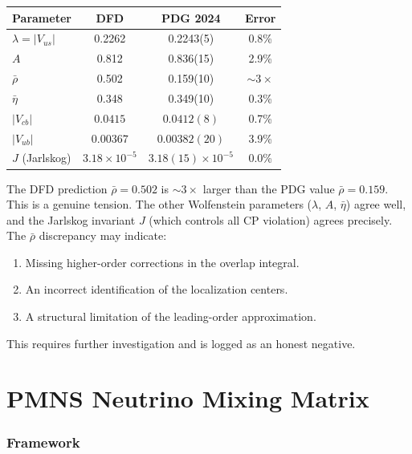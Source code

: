 \documentclass[11pt,a4paper]{article}
\theoremstyle{remark}
\begin{document}
\begin{center}
\begin{tabular}{lccc}
\toprule
\textbf{Parameter} & \textbf{DFD} & \textbf{PDG 2024} & \textbf{Error} \\
\midrule
$\lambda = |V_{us}|$ & 0.2262 & 0.2243(5) & 0.8\% \\
$A$ & 0.812 & 0.836(15) & 2.9\% \\
$\bar\rho$ & 0.502 & 0.159(10) & $\sim 3\times$ \\
$\bar\eta$ & 0.348 & 0.349(10) & 0.3\% \\
\midrule
$|V_{cb}|$ & $0.0415$ & $0.0412(8)$ & 0.7\% \\
$|V_{ub}|$ & $0.00367$ & $0.00382(20)$ & 3.9\% \\
$J$ (Jarlskog) & $3.18 \times 10^{-5}$ & $3.18(15) \times 10^{-5}$ & 0.0\% \\
\bottomrule
\end{tabular}
\end{center}

\begin{tcolorbox}[colback=red!5!white, colframe=dfdred!70!black,
  title=Honest Assessment: $\bar\rho$ Discrepancy]
The DFD prediction $\bar\rho = 0.502$ is $\sim 3\times$ larger than the
PDG value $\bar\rho = 0.159$. This is a genuine tension. The other
Wolfenstein parameters ($\lambda$, $A$, $\bar\eta$) agree well, and
the Jarlskog invariant $J$ (which controls all CP violation) agrees
precisely. The $\bar\rho$ discrepancy may indicate:
\begin{enumerate}
\item Missing higher-order corrections in the overlap integral.
\item An incorrect identification of the localization centers.
\item A structural limitation of the leading-order approximation.
\end{enumerate}
This requires further investigation and is logged as an honest negative.
\end{tcolorbox}


\newpage
\part{PMNS Neutrino Mixing Matrix}
\label{part:PMNS}

\section{Framework}
\end{document}
